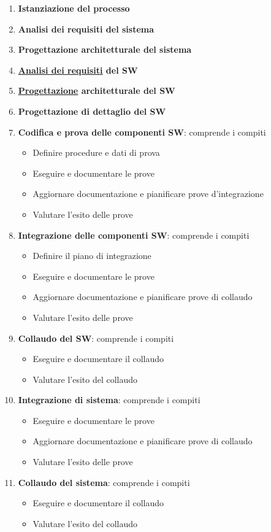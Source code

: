			\begin{enumerate}
				\item \textbf{Istanziazione del processo}
				\item \textbf{Analisi dei requisiti del sistema}
				\item \textbf{Progettazione architetturale del sistema}
				\item \textbf{\underline{\hyperref[analisideirequisiti]{Analisi dei requisiti}} del SW}
				\item \textbf{\underline{\hyperref[progettazione]{Progettazione}} architetturale del SW}
				\item \textbf{Progettazione di dettaglio del SW}
				\item \textbf{Codifica e prova delle componenti SW}: comprende i compiti
					\begin{itemize}
						\item Definire procedure e dati di prova
						\item Eseguire e documentare le prove
						\item Aggiornare documentazione e pianificare prove d’integrazione
						\item Valutare l’esito delle prove
					\end{itemize}
				\item \textbf{Integrazione delle componenti SW}: comprende i compiti
					\begin{itemize}
						\item Definire il piano di integrazione
						\item Eseguire e documentare le prove
						\item Aggiornare documentazione e pianificare prove di collaudo
						\item Valutare l’esito delle prove
					\end{itemize}
				\item \textbf{Collaudo del SW}: comprende i compiti
					\begin{itemize}
						\item Eseguire e documentare il collaudo
						\item Valutare l’esito del collaudo
					\end{itemize}
				\item \textbf{Integrazione di sistema}: comprende i compiti
					\begin{itemize}
						\item Eseguire e documentare le prove
						\item Aggiornare documentazione e pianificare prove di collaudo
						\item Valutare l’esito delle prove
					\end{itemize}
				\item \textbf{Collaudo del sistema}: comprende i compiti
					\begin{itemize}
						\item Eseguire e documentare il collaudo
						\item Valutare l’esito del collaudo
					\end{itemize}
			\end{enumerate}
